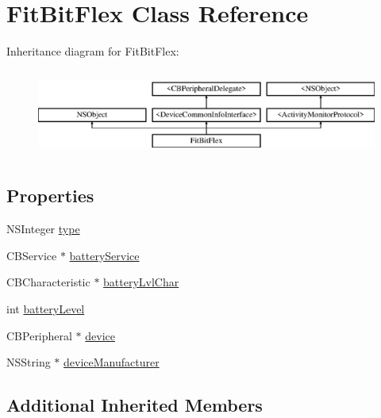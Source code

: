 \hypertarget{interface_fit_bit_flex}{\section{Fit\-Bit\-Flex Class Reference}
\label{interface_fit_bit_flex}
}
Inheritance diagram for Fit\-Bit\-Flex\-:\begin{figure}[H]
\begin{center}
\leavevmode
\includegraphics[height=2.901554cm]{interface_fit_bit_flex}
\end{center}
\end{figure}
\subsection*{Properties}
\begin{DoxyCompactItemize}
\item 
N\-S\-Integer \hyperlink{interface_fit_bit_flex_a77895e42698dfb9e32ea3511dd68aa3e}{type}
\item 
C\-B\-Service $\ast$ \hyperlink{interface_fit_bit_flex_af23b05b17587b9810d93909f279cca75}{battery\-Service}
\item 
C\-B\-Characteristic $\ast$ \hyperlink{interface_fit_bit_flex_a0d5ca990dbff1852b3d8a07faa91234b}{battery\-Lvl\-Char}
\item 
int \hyperlink{interface_fit_bit_flex_a6141ecb075c9553d179dc5210d2c4952}{battery\-Level}
\item 
C\-B\-Peripheral $\ast$ \hyperlink{interface_fit_bit_flex_ac539ad853d5729137679c3293cba75f5}{device}
\item 
N\-S\-String $\ast$ \hyperlink{interface_fit_bit_flex_a3b4fca544836750998946aab4d4c8a3d}{device\-Manufacturer}
\end{DoxyCompactItemize}
\subsection*{Additional Inherited Members}


